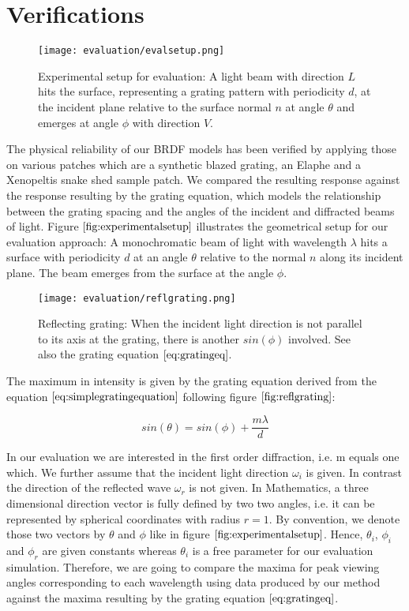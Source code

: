 \section{Verifications}
\label{sec:approachesverifications}
\begin{figure}[H]
  \centering
  \texttt{[image: evaluation/evalsetup.png]}
  \caption[Experimental Setup]{Experimental setup for evaluation: A light beam with direction $L$ hits the surface, representing a grating pattern with periodicity $d$, at the incident plane relative to the surface normal $n$ at angle $\theta$ and emerges at angle $\phi$ with direction $V$.}
  \label{fig:experimentalsetup}
\end{figure}

The physical reliability of our BRDF models has been verified by applying those on various patches which are a synthetic blazed grating, an Elaphe and a Xenopeltis snake shed sample patch. We compared the resulting response against the response resulting by the grating equation, which models the relationship between the grating spacing and the angles of the incident and diffracted beams of light. Figure $\ref{fig:experimentalsetup}$ illustrates the geometrical setup for our evaluation approach: A monochromatic beam of light with wavelength $\lambda$ hits a surface with periodicity $d$ at an angle $\theta$ relative to the normal $n$ along its incident plane. The beam emerges from the surface at the angle $\phi$. 

\begin{figure}[H]
  \centering
  \texttt{[image: evaluation/reflgrating.png]}
  \caption[Reflective Grating]{Reflecting grating: When the incident light direction is not parallel to its axis at the grating, there is another $sin(\phi)$ involved. See also the grating equation $\ref{eq:gratingeq}$.}
  \label{fig:reflgrating}
\end{figure}

The maximum in intensity is given by the grating equation derived from the equation $\ref{eq:simplegratingequation}$ following figure $\ref{fig:reflgrating}$: 

\begin{equation}
  sin(\theta) = sin(\phi) + \frac{m \lambda}{d}
\label{eq:gratingeq}
\end{equation}

In our evaluation we are interested in the first order diffraction, i.e. m equals one which. We further assume that the incident light direction $\omega_i$ is given. In contrast the direction of the reflected wave $\omega_r$ is not given.
In Mathematics, a three dimensional direction vector is fully defined by two two angles, i.e. it can be represented by spherical coordinates with radius $r = 1$. By convention, we denote those two vectors by $\theta$ and $\phi$ like in figure $\ref{fig:experimentalsetup}$. Hence, $\theta_i$, $\phi_i$ and $\phi_r$ are given constants whereas $\theta_i$ is a free parameter for our evaluation simulation. Therefore, we are going to compare the maxima for peak viewing angles corresponding to each wavelength using data produced by our method against the maxima resulting by the grating equation $\ref{eq:gratingeq}$.

